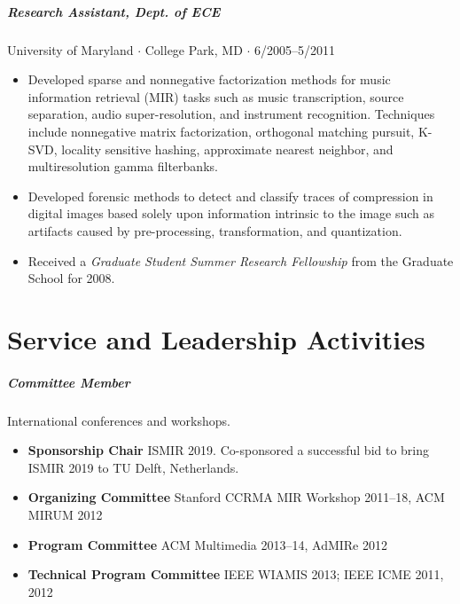\documentclass[10pt,letterpaper]{article}
\begin{document}
\subparagraph{Research Assistant, Dept. of ECE}
University of Maryland $\cdot$ College Park, MD $\cdot$ 6/2005--5/2011
\begin{itemize}
    \item Developed sparse and nonnegative factorization methods for music information retrieval (MIR) tasks such as music transcription, source separation, audio super-resolution, and instrument recognition. Techniques include nonnegative matrix factorization, orthogonal matching pursuit, K-SVD, locality sensitive hashing, approximate nearest neighbor, and multiresolution gamma filterbanks.
    \item Developed forensic methods to detect and classify traces of compression in digital images based solely upon information intrinsic to the image such as artifacts caused by pre-processing, transformation, and quantization.
    \item Received a \textit{Graduate Student Summer Research Fellowship} from the Graduate School for 2008.
\end{itemize}







\section*{Service and Leadership Activities}

\subparagraph{Committee Member} International conferences and workshops.
\begin{itemize}
    \item \textbf{Sponsorship Chair} ISMIR 2019. Co-sponsored a successful bid to bring ISMIR 2019 to TU Delft, Netherlands.
    \item \textbf{Organizing Committee} Stanford CCRMA MIR Workshop 2011--18, ACM MIRUM 2012
    \item \textbf{Program Committee} ACM Multimedia 2013--14, AdMIRe 2012
    \item \textbf{Technical Program Committee} IEEE WIAMIS 2013; IEEE ICME 2011, 2012
\end{itemize}
\end{document}

